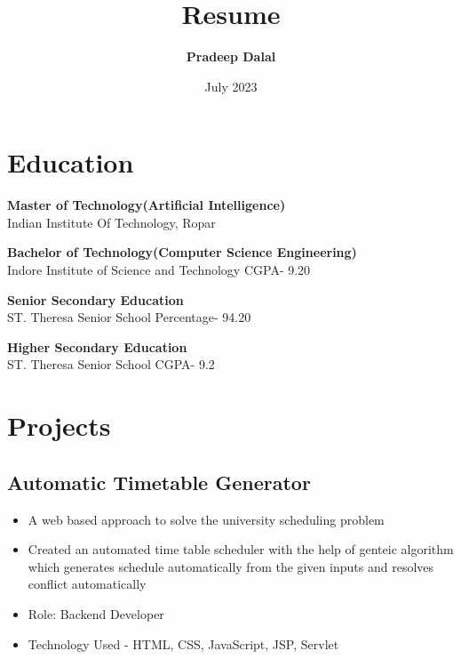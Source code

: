 \documentclass{article}[14pt]
\title{\textbf{Resume}}
\author{\textbf{Pradeep Dalal}}
\date{July 2023}
\begin{document}
\maketitle
\section{Education}

{\large \textbf{Master of Technology(Artificial Intelligence)}}\\
{\normalsize Indian Institute Of Technology, Ropar}

 \vspace{10px}
 
{\raggedleft \large \textbf{Bachelor of Technology(Computer Science Engineering)}}\\
{\normalsize Indore Institute of Science and Technology}
{\small \null\hfill CGPA- 9.20}

 \vspace{10px}

 
{\raggedleft \large \textbf{Senior Secondary Education}}\\
{\normalsize ST. Theresa Senior School}
{\small \null\hfill Percentage- 94.20}

\vspace{10px}


{\raggedleft \large \textbf{Higher Secondary Education}}\\
{\normalsize ST. Theresa Senior School}
{\small \null\hfill CGPA- 9.2}

\section{Projects}

   \subsection{Automatic Timetable Generator} 
    \begin{itemize}
        \item {\normalsize A web based approach to solve the university scheduling problem}
        \item {\normalsize Created an automated time table scheduler with the help of genteic algorithm which generates schedule automatically from the given inputs and resolves conflict automatically}

        \item {\normalsize Role: Backend Developer}
        \item {\normalsize Technology Used - HTML, CSS, JavaScript, JSP, Servlet}
    \end{itemize}
\end{document}
